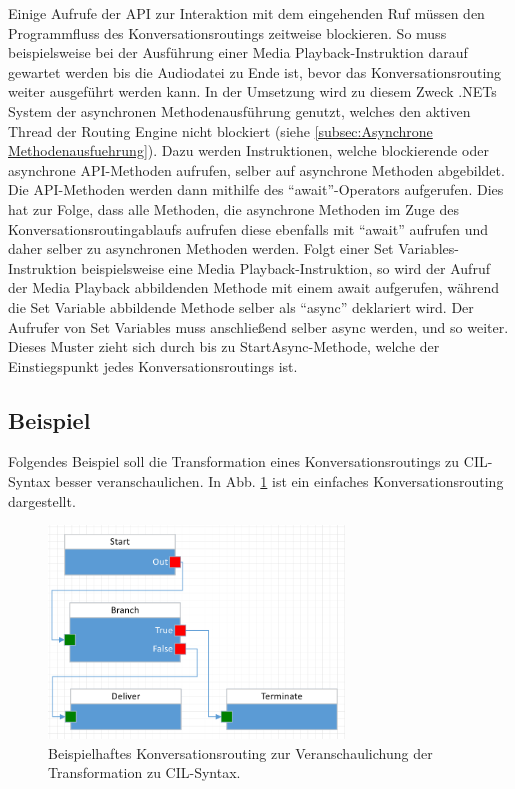Einige Aufrufe der API zur Interaktion mit dem eingehenden Ruf müssen den Programmfluss des Konversationsroutings zeitweise blockieren. So muss beispielsweise bei der Ausführung einer Media Playback-Instruktion darauf gewartet werden bis die Audiodatei zu Ende ist, bevor das Konversationsrouting weiter ausgeführt werden kann. In der Umsetzung wird zu diesem Zweck .NETs System der asynchronen Methodenausführung genutzt, welches den aktiven Thread der Routing Engine nicht blockiert (siehe \ref{subsec:Asynchrone Methodenausfuehrung}). Dazu werden Instruktionen, welche blockierende oder asynchrone API-Methoden aufrufen, selber auf asynchrone Methoden abgebildet. Die API-Methoden werden dann mithilfe des ``await''-Operators aufgerufen. Dies hat zur Folge, dass alle Methoden, die asynchrone Methoden im Zuge des Konversationsroutingablaufs aufrufen diese ebenfalls mit ``await'' aufrufen und daher selber zu asynchronen Methoden werden. Folgt einer Set Variables-Instruktion beispielsweise eine Media Playback-Instruktion, so wird der Aufruf der Media Playback abbildenden Methode mit einem await aufgerufen, während die Set Variable abbildende Methode selber als ``async'' deklariert wird. Der Aufrufer von Set Variables muss anschließend selber async werden, und so weiter. Dieses Muster zieht sich durch bis zu StartAsync-Methode, welche der Einstiegspunkt jedes Konversationsroutings ist.

\subsection{Beispiel}
\label{subsec:Beispiel}
Folgendes Beispiel soll die Transformation eines Konversationsroutings zu CIL-Syntax besser veranschaulichen. In Abb. \ref{fig:FlowToCode} ist ein einfaches Konversationsrouting dargestellt. 

\begin{figure} %
	\centering
		\includegraphics[width=0.7\textwidth]{img/FlowToCodeExample.png}
	\caption[Beispielhaftes Konversationsrouting zur Veranschaulichung der Transformation zu C\#-Syntax]{Beispielhaftes Konversationsrouting zur Veranschaulichung der Transformation zu CIL-Syntax.}
	\label{fig:FlowToCode}
\end{figure}


